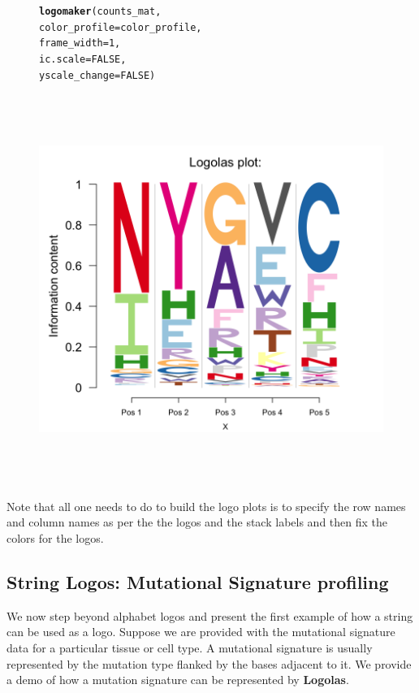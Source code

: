 \documentclass[12pt]{article}\usepackage[]{graphicx}\usepackage[usenames,dvipsnames]{color}
\makeatletter
\newcommand{\hlnum}[1]{\textcolor[rgb]{0.686,0.059,0.569}{#1}}%
\newcommand{\hlstd}[1]{\textcolor[rgb]{0.345,0.345,0.345}{#1}}%
\newcommand{\hlkwc}[1]{\textcolor[rgb]{0.333,0.667,0.333}{#1}}%
\newcommand{\hlkwd}[1]{\textcolor[rgb]{0.737,0.353,0.396}{\textbf{#1}}}%
\newenvironment{kframe}{%
 \def\at@end@of@kframe{}%
 \ifinner\ifhmode%
  \def\at@end@of@kframe{\end{minipage}}%
  \begin{minipage}{\columnwidth}%
 \fi\fi%
 \def\FrameCommand##1{\hskip\@totalleftmargin \hskip-\fboxsep
 \colorbox{shadecolor}{##1}\hskip-\fboxsep
     \hskip-\linewidth \hskip-\@totalleftmargin \hskip\columnwidth}%
 \MakeFramed {\advance\hsize-\width
   \@totalleftmargin\z@ \linewidth\hsize
   \@setminipage}}%
 {\par\unskip\endMakeFramed%
 \at@end@of@kframe}
\newenvironment{knitrout}{}{} %
\makeatother
\begin{document}
\begin{figure}[htp]
\begin{center}
\begin{knitrout}
\begin{kframe}
\begin{alltt}
\hlkwd{logomaker}\hlstd{(counts_mat,}
          \hlkwc{color_profile} \hlstd{= color_profile,}
          \hlkwc{frame_width} \hlstd{=} \hlnum{1}\hlstd{,}
          \hlkwc{ic.scale}  \hlstd{=} \hlnum{FALSE}\hlstd{,}
          \hlkwc{yscale_change} \hlstd{=} \hlnum{FALSE}\hlstd{)}
\end{alltt}
\end{kframe}
\includegraphics[width=6in,height=5in]{figure/logolas_use_5-1} 

\end{knitrout}
\end{center}
\end{figure}

Note that all one needs to do to build the logo plots is to specify the row names and column names as per the the logos and the stack labels and then fix the colors for the logos.

\newpage

\subsection{String Logos: Mutational Signature profiling}

We now step beyond alphabet logos and present the first example of how a string can be used as a logo. Suppose we are provided with the mutational signature data for a particular tissue or cell type. A mutational signature is usually represented by the mutation type flanked by the bases adjacent to it. We provide a demo of how a mutation signature can be represented by \textbf{Logolas}.
\end{document}
